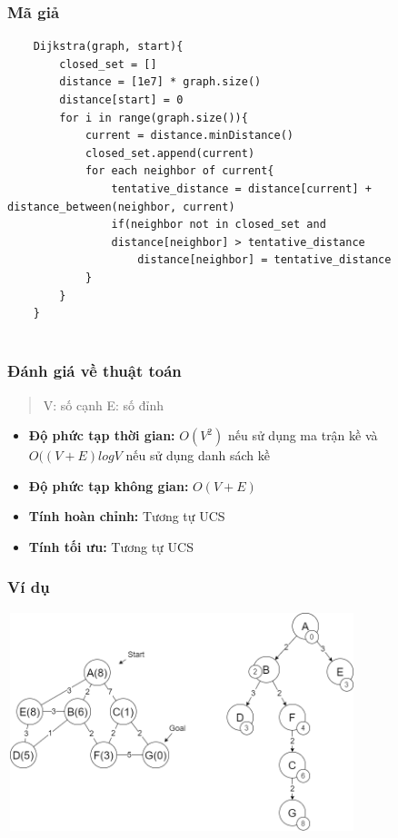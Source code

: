 \documentclass{article}
\begin{document}
\subsubsection{Mã giả}

\begin{verbatim}
    Dijkstra(graph, start){
        closed_set = []
        distance = [1e7] * graph.size()
        distance[start] = 0
        for i in range(graph.size()){
            current = distance.minDistance()
            closed_set.append(current)
            for each neighbor of current{
                tentative_distance = distance[current] + distance_between(neighbor, current)
                if(neighbor not in closed_set and 
                distance[neighbor] > tentative_distance
                    distance[neighbor] = tentative_distance
            }
        }
    }
    
\end{verbatim}
\subsubsection{Đánh giá về thuật toán}
\begin{quote}
    V: số cạnh \hspace{0.5in}
    E: số đỉnh 
\end{quote}
\begin{itemize}
    \item \textbf{Độ phức tạp thời gian:} $O(V^2)$ nếu sử dụng ma trận kề và $O((V+E)logV$ nếu sử dụng danh sách kề
    \item \textbf{Độ phức tạp không gian:} $O(V+E)$ 
    \item \textbf{Tính hoàn chỉnh:} Tương tự UCS
    \item \textbf{Tính tối ưu:} Tương tự UCS
\end{itemize}

\subsubsection{Ví dụ}
    \centerline{\includegraphics[width=4in, height=2.5in]{image/dijkstra.png}}
    \vspace{2\baselineskip}
    
\end{document}

